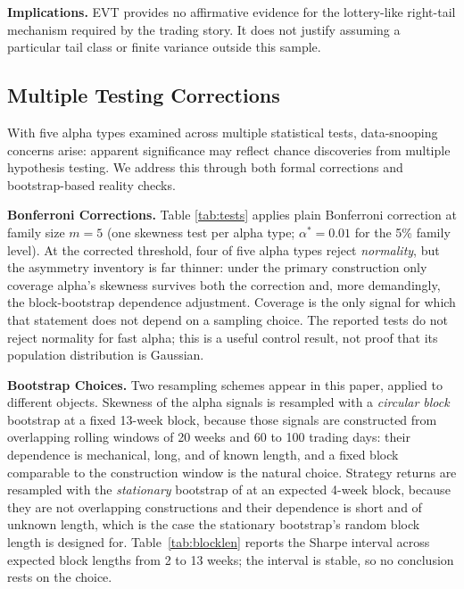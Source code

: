 \documentclass[11pt]{article}
\begin{document}
\textbf{Implications.} EVT provides no affirmative evidence for the lottery-like right-tail mechanism required by the trading story. It does not justify assuming a particular tail class or finite variance outside this sample.

\subsection{Multiple Testing Corrections}
\label{sec:snooping}

With five alpha types examined across multiple statistical tests, data-snooping concerns arise: apparent significance may reflect chance discoveries from multiple hypothesis testing. We address this through both formal corrections and bootstrap-based reality checks.

\textbf{Bonferroni Corrections.} Table \ref{tab:tests} applies plain Bonferroni correction at family size $m = 5$ (one skewness test per alpha type; $\alpha^* = 0.01$ for the 5\% family level). At the corrected threshold, four of five alpha types reject \emph{normality}, but the asymmetry inventory is far thinner: under the primary construction only coverage alpha's skewness survives both the correction and, more demandingly, the block-bootstrap dependence adjustment. Coverage is the only signal for which that statement does not depend on a sampling choice. The reported tests do not reject normality for fast alpha; this is a useful control result, not proof that its population distribution is Gaussian.

\textbf{Bootstrap Choices.} Two resampling schemes appear in this paper, applied to different objects. Skewness of the alpha signals is resampled with a \emph{circular block} bootstrap at a fixed 13-week block, because those signals are constructed from overlapping rolling windows of 20 weeks and 60 to 100 trading days: their dependence is mechanical, long, and of known length, and a fixed block comparable to the construction window is the natural choice. Strategy returns are resampled with the \emph{stationary} bootstrap of \citet{politis1994stationary} at an expected 4-week block, because they are not overlapping constructions and their dependence is short and of unknown length, which is the case the stationary bootstrap's random block length is designed for. Table~\ref{tab:blocklen} reports the Sharpe interval across expected block lengths from 2 to 13 weeks; the interval is stable, so no conclusion rests on the choice.
\end{document}

